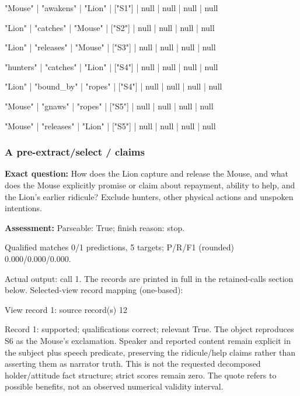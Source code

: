 "Mouse" | "awakens" | "Lion" | ["S1"] | null | null | null | null\par\smallskip

"Lion" | "catches" | "Mouse" | ["S2"] | null | null | null | null\par\smallskip

"Lion" | "releases" | "Mouse" | ["S3"] | null | null | null | null\par\smallskip

"hunters" | "catches" | "Lion" | ["S4"] | null | null | null | null\par\smallskip

"Lion" | "bound\_by" | "ropes" | ["S4"] | null | null | null | null\par\smallskip

"Mouse" | "gnaws" | "ropes" | ["S5"] | null | null | null | null\par\smallskip

"Mouse" | "releases" | "Lion" | ["S5"] | null | null | null | null\par\smallskip

\subsubsection*{A pre-extract/select / claims}

\noindent\textbf{Exact question:} How does the Lion capture and release the Mouse, and what does the Mouse explicitly promise or claim about repayment, ability to help, and the Lion's earlier ridicule? Exclude hunters, other physical actions and unspoken intentions.\par

\noindent\textbf{Assessment:} Parseable: True; finish reason: stop.

Qualified matches 0/1 predictions, 5 targets; P/R/F1 (rounded) 0.000/0.000/0.000.\par

Actual output: call 1. The records are printed in full in the retained-calls section below. Selected-view record mapping (one-based):

View record 1: source record(s) 12\par

\noindent Record 1: supported; qualifications correct; relevant True. The object reproduces S6 as the Mouse's exclamation. Speaker and reported content remain explicit in the subject plus speech predicate, preserving the ridicule/help claims rather than asserting them as narrator truth. This is not the requested decomposed holder/attitude fact structure; strict scores remain zero. The quote refers to possible benefits, not an observed numerical validity interval.\par\smallskip

